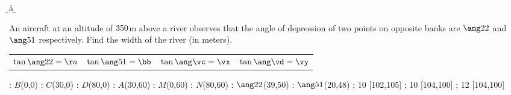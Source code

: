 

\va\vc
{}\vb\vd
\DEGREESTAN\vc\vm
\DEGREESTAN\vd\vn
\ROUND[2]\vm\vx
\ROUND[2]\vn\vy
\ADD\vx\vy\vz
\MULTIPLY\vh\vz\vv
\ROUND[2]\vv\vw

\DEGREESTAN\va\a
\DEGREESTAN\vb\b
\ROUND[2]\a\aa
\ROUND[2]\b\bb

\question[2] An aircraft at an altitude of $350$m above a river observes that the angle 
of depression of two points on opposite banks are $\ang\va$ and $\ang\vb$ respectively.
Find the width of the river (in meters).

\watchout

\begin{calcaid}
  \begin{tabular}{c c c c}
    $\tan\ang\va=\aa$ & $\tan\ang\vb=\bb$ & $\tan\ang\vc=\vx$ & $\tan\ang\vd=\vy$ 
  \end{tabular}
\end{calcaid}

\ifprintanswers
  \begin{marginfigure}[-70pt]
      : $B$(0,0)
      : $C$(30,0)
      : $D$(80,0)
      : $A$(30,60)
      : $M$(0,60)
      : $N$(80,60)
      : $\ang\va$(39,50) %
      : $\ang\vb$(20,48)
    \figdrawbegin{}
      \figdrawline [100,103,102,101,100]
      \figdrawline [103,101]
      \figdrawline [104,105]
       ; 10 [102,105] 
       ; 10 [104,100] 
       ; 12 [104,100] 
    \figdrawend
    \centerline{\box\figBoxA}
  \end{marginfigure}
\fi 

